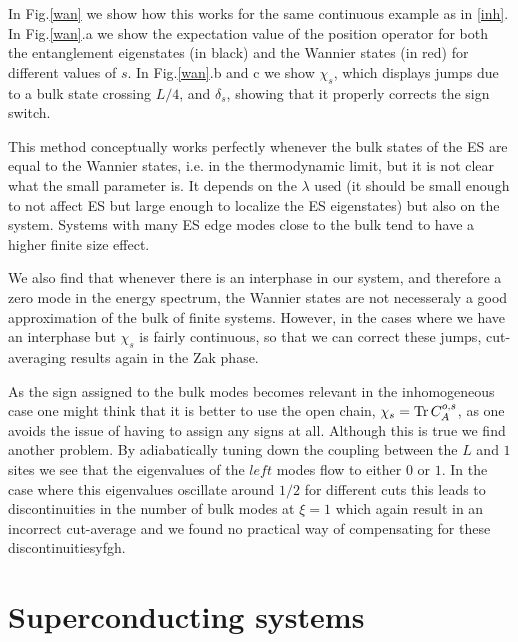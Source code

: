 \documentclass[twocolumn,amsmath,longbibliography,amssymb,superscriptaddress]{revtex4-1}
\begin{document}
In Fig.\ref{wan} we show how this works for the same continuous example as in \ref{inh}. In Fig.\ref{wan}.a we show the expectation value of the position operator for both the entanglement eigenstates (in black) and the Wannier states (in red) for different values of $s$. In Fig.\ref{wan}.b and c we show $\chi_s$, which displays jumps due to a bulk state crossing $L/4$, and $\delta_s$, showing that it properly corrects the sign switch.

This method conceptually works perfectly whenever the bulk states of the ES are equal to the Wannier states, i.e. in the thermodynamic limit, but it is not clear what the small parameter is. It depends on the $\lambda$ used (it should be small enough to not affect ES but large enough to localize the ES eigenstates) but also on the system. Systems with many ES edge modes close to the bulk tend to have a higher finite size effect.

We also find that whenever there is an interphase in our system, and therefore a zero mode in the energy spectrum, the Wannier states are not necesseraly a good approximation of the bulk of finite systems. However, in the cases where we have an interphase but $\chi_s$ is fairly continuous, so that we can correct these jumps, cut-averaging results again in the Zak phase. 

As the sign assigned to the bulk modes becomes relevant in the inhomogeneous case one might think that it is better to use the open chain, $\chi_s = \Tr C_A^{o,s}$, as one avoids the issue of having to assign any signs at all. Although this is true we find another problem. By adiabatically tuning down the coupling between the $L$ and $1$ sites we see that the eigenvalues of the $left$ modes flow to either $0$ or $1$. In the case where this eigenvalues oscillate around $1/2$ for different cuts this leads to discontinuities in the number of bulk modes at $\xi=1$ which again result in an incorrect cut-average and we found no practical way of compensating for these discontinuitiesyfgh. 


\section{Superconducting systems}
\end{document}
